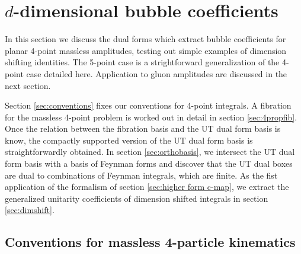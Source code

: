 \documentclass[11pt]{article}
\begin{document}
\section{$d$-dimensional bubble coefficients} \label{sec:cbub4}

In this section we discuss the dual forms which extract bubble coefficients for planar 4-point massless amplitudes, testing out simple examples of dimension shifting identities. 
The 5-point case is a strightforward generalization of the 4-point case detailed here. 
Application to gluon amplitudes are discussed in the next section.


Section \ref{sec:conventions} fixes our conventions for 4-point integrals. 
A fibration for the massless 4-point problem is worked out in detail in section \ref{sec:4propfib}. 
Once the relation between the fibration basis and the UT dual form basis is know, the compactly supported version of the UT dual form basis is straightforwardly obtained. 
In section \ref{sec:orthobasis}, we intersect the UT dual form basis with a basis of Feynman forms and discover that the UT dual boxes are dual to combinations of Feynman integrals, which are finite. 
As the fist application of the formalism of section \ref{sec:higher form c-map}, we extract the generalized unitarity coefficients of dimension shifted integrals in section \ref{sec:dimshift}. 



\subsection{Conventions for massless 4-particle kinematics \label{sec:conventions}}
\end{document}
